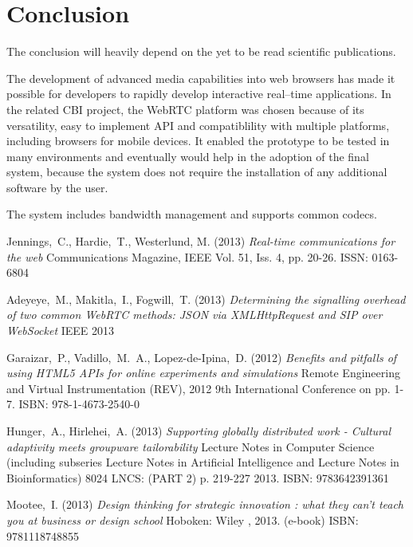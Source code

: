 \documentclass[english,12pt,a4paper,dvips]{article}
\begin{document}
\clearpage


\section{Conclusion}

The conclusion will heavily depend on the yet to be read scientific publications.

The development of advanced media capabilities into web browsers has made it possible for developers to rapidly develop interactive real--time applications. In the related CBI project, the WebRTC platform was chosen because of its versatility, easy to implement API and compatiblility with multiple platforms, including browsers for mobile devices. It enabled the prototype to be tested in many environments and eventually would help in the adoption of the final system, because the system does not require the installation of any additional software by the user.

The system includes bandwidth management and supports common codecs. 

\clearpage


\begin{thebibliography}{99}

 Jennings,\ C., Hardie,\ T., Westerlund, M. (2013) \textit{Real-time communications for the web} Communications Magazine, IEEE Vol. 51, Iss. 4, pp. 20-26. ISSN: 0163-6804

 Adeyeye,\ M., Makitla,\ I., Fogwill,\ T. (2013) \textit{Determining the signalling overhead of two common WebRTC methods: JSON via XMLHttpRequest and SIP over WebSocket} IEEE 2013

 Garaizar,\ P., Vadillo,\ M.\ A., Lopez-de-Ipina,\ D. (2012) \textit{Benefits and pitfalls of using HTML5 APIs for online experiments and simulations} Remote Engineering and Virtual Instrumentation (REV), 2012 9th International Conference on pp. 1-7. ISBN: 978-1-4673-2540-0

 Hunger,\ A., Hirlehei,\ A. (2013) \textit{Supporting globally distributed work - Cultural adaptivity meets groupware tailorability} Lecture Notes in Computer Science (including subseries Lecture Notes in Artificial Intelligence and Lecture Notes in Bioinformatics) 8024 LNCS: (PART 2) p. 219-227 2013. ISBN: 9783642391361

 Mootee,\ I. (2013) \textit{Design thinking for strategic innovation : what they can't teach you at business or design school} Hoboken: Wiley , 2013. (e-book) ISBN: 9781118748855

\bibitem{} \textit{}


\end{thebibliography}
\end{document}

